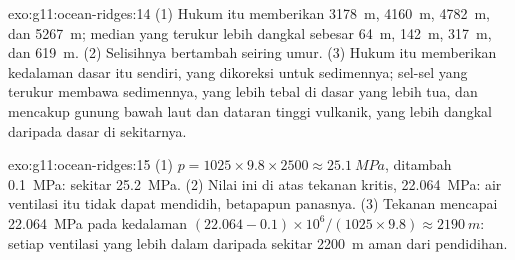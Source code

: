 \begin{solution}{exo:g11:ocean-ridges:14}
(1) Hukum itu memberikan \qty{3178}{m}, \qty{4160}{m}, \qty{4782}{m}, dan
\qty{5267}{m}; median yang terukur lebih dangkal sebesar \qty{64}{m},
\qty{142}{m}, \qty{317}{m}, dan \qty{619}{m}. (2) Selisihnya bertambah seiring
umur. (3) Hukum itu memberikan kedalaman dasar itu sendiri, yang dikoreksi untuk
sedimennya; sel-sel yang terukur membawa sedimennya, yang lebih tebal di dasar
yang lebih tua, dan mencakup gunung bawah laut dan dataran tinggi vulkanik, yang
lebih dangkal daripada dasar di sekitarnya.
\end{solution}

\begin{solution}{exo:g11:ocean-ridges:15}
(1) $p = 1025 \times 9.8 \times 2500 \approx \qty{25.1}{MPa}$, ditambah
\qty{0.1}{MPa}: sekitar \qty{25.2}{MPa}. (2) Nilai ini di atas tekanan kritis,
\qty{22.064}{MPa}: air ventilasi itu tidak dapat mendidih, betapapun panasnya.
(3) Tekanan mencapai \qty{22.064}{MPa} pada kedalaman
$(22.064 - 0.1) \times 10^6/(1025 \times 9.8) \approx \qty{2190}{m}$: setiap
ventilasi yang lebih dalam daripada sekitar \qty{2200}{m} aman dari pendidihan.
\end{solution}

